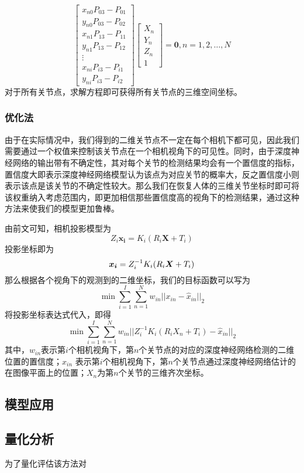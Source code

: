 \begin{equation}
    \left[ \begin{array}{c}
        x_{n0}P_{03} - P_{01} \\ 
        y_{n0}P_{03} - P_{02} \\
        x_{n1}P_{13} - P_{11} \\ 
        y_{n1}P_{13} - P_{12} \\
        \vdots \\
        x_{ni}P_{i3} - P_{i1} \\ 
        y_{ni}P_{i3} - P_{i2} 
    \end{array}\right] \left[ \begin{array}{c}
        X_n \\
        Y_n\\
        Z_n\\
        1 
    \end{array}\right]  = \bm{0}, n = 1,2,\ldots,N
\end{equation}
对于所有关节点，求解方程即可获得所有关节点的三维空间坐标。

\subsubsection{优化法}
由于在实际情况中，我们得到的二维关节点不一定在每个相机下都可见，因此我们需要通过一个权值来控制该关节点在一个相机视角下的可见性。同时，由于深度神经网络的输出带有不确定性，其对每个关节的检测结果均会有一个置信度的指标，置信度大即表示深度神经网络模型认为该点为对应关节的概率大，反之置信度小则表示该点是该关节的不确定性较大。那么我们在恢复人体的三维关节坐标时即可将该权重纳入考虑范围内，即更加相信那些置信度高的视角下的检测结果，通过这种方法来使我们的模型更加鲁棒。

由前文可知，相机投影模型为
\begin{equation}
    Z_i \bm{x_i} = K_i(R_i\bm{X} + T_i)
\end{equation}
投影坐标即为
\begin{equation}
    \bm{x_i} = Z_i^{-1}K_i(R_i{\bm{X}} + T_i)    
\end{equation}
那么根据各个视角下的观测到的二维坐标，我们的目标函数可以写为
\begin{equation}
    \min \sum^I_{i=1} \sum_{n=1}^N w_{in}||x_{in} - \hat x_{in}||_2
\end{equation}
将投影坐标表达式代入，即得
\begin{equation}
    \min \sum^I_{i=1} \sum_{n=1}^N w_{in}||Z_i^{-1}K_i(R_iX_n + T_i) - \hat x_{in}||_2  
\end{equation}
\newcommand{\mi}{第\(i\)个}
\newcommand{\mn}{第\(n\)个}
其中，$w_{in}$表示\mi 相机视角下，\mn 关节点的对应的深度神经网络检测的二维位置的置信度；$\hat x_{in}$ 表示\mi 相机视角下，\mn 关节点通过深度神经网络估计的在图像平面上的位置；$X_n$为\mn 关节的三维齐次坐标。

\subsection{模型应用}

\subsection{量化分析}
为了量化评估该方法对
